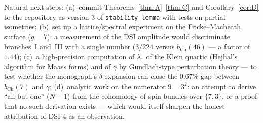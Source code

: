 \documentclass[11pt,a4paper]{article}
\theoremstyle{definition}
\theoremstyle{remark}
\begin{document}
Natural next steps: (a)~commit Theorems~\ref{thm:A}--\ref{thm:C} and
Corollary~\ref{cor:D} to the repository as version 3 of
\texttt{stability\_lemma} with tests on partial isometries;
(b)~set up a lattice/spectral experiment on the Fricke--Macbeath surface
($g = 7$): a measurement of the DSI amplitude would discriminate branches~I
and~III with a single number ($3/224$ versus $b_{\mathrm{Ch}}(46)$ --- a
factor of $1.44$); (c)~a high-precision computation of $\lambda_1$ of the
Klein quartic (Hejhal's algorithm for Maass forms) and of $\gamma$ by
Gundlach-type perturbation theory --- to test whether the monograph's
$\delta$-expansion can close the $0.67\%$ gap between $b_{\mathrm{Ch}}(7)$
and $\gamma$; (d)~analytic work on the numerator $9 = 3^2$: an attempt to
derive ``all but one'' ($N - 1$) from the cohomology of spin bundles over
$\{7,3\}$, or a proof that no such derivation exists --- which would itself
sharpen the honest attribution of DSI-4 as an observation.
\end{document}
